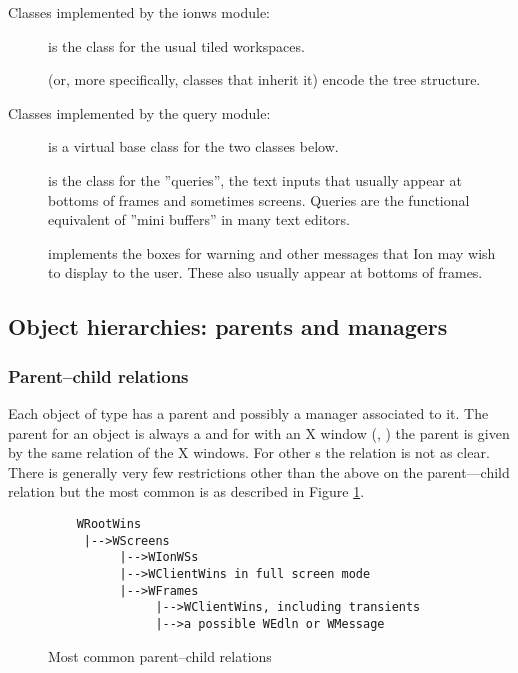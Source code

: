 Classes implemented by the ionws module:

\begin{description}
  \item[] is the class for the
    usual tiled workspaces.
  \item[] (or, more specifically, classes
    that inherit it) encode the  tree structure.
\end{description}


Classes implemented by the query module:

\begin{description}
  \item[] is a virtual base class for the
    two classes below.
  \item[] is the class for the ''queries'',
    the text inputs that usually appear at bottoms of frames and sometimes
    screens. Queries are the functional equivalent of ''mini buffers'' in
    many text editors.
  \item[] implements the boxes for 
    warning and other messages that Ion may wish to display to the user. 
    These also usually appear at bottoms of frames.
\end{description}


\subsection{Object hierarchies:  parents and managers}

\subsubsection{Parent--child relations}
Each object of type  has a parent and possibly a manager
associated to it. The parent for an object is always a 
 and for  with an X window (,
) the parent  is given by the same relation of
the X windows. For other s the relation is not as clear.
There is generally very few restrictions other than the above on the
parent---child relation but the most common is as described in
Figure \ref{fig:parentship}.

\begin{figure}
\begin{htmlonly}
\docode %
\end{htmlonly}
\begin{verbatim}
    WRootWins
     |-->WScreens
          |-->WIonWSs
          |-->WClientWins in full screen mode
          |-->WFrames
               |-->WClientWins, including transients
               |-->a possible WEdln or WMessage
\end{verbatim}
\caption{Most common parent--child relations}
\label{fig:parentship}
\end{figure}

